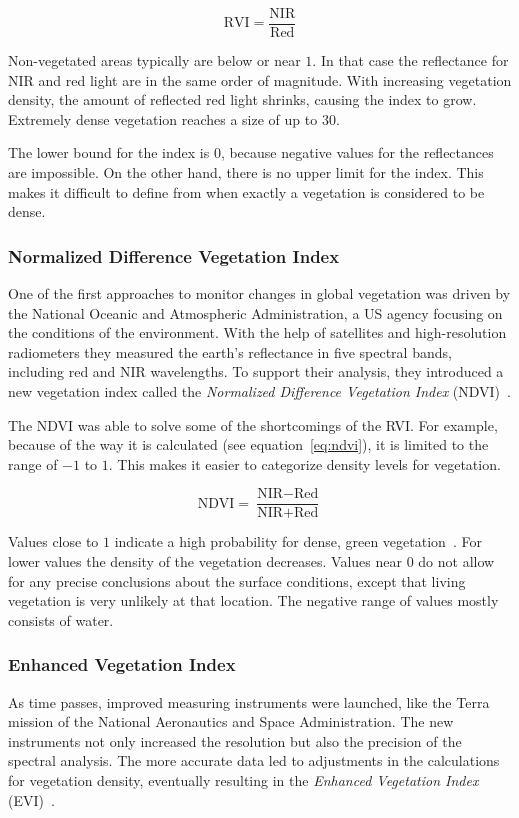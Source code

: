 \begin{equation}
    \text{RVI} = \frac{\text{NIR}}{\text{Red}}
    \label{eq:rvi}
\end{equation}

Non-vegetated areas typically are below or near $1$. In that case the reflectance for NIR and red light are in the same order of magnitude. With increasing vegetation density, the amount of reflected red light shrinks, causing the index to grow. Extremely dense vegetation reaches a size of up to $30$.

The lower bound for the index is $0$, because negative values for the reflectances are impossible. On the other hand, there is no upper limit for the index. This makes it difficult to define from when exactly a vegetation is considered to be dense.

\subsubsection{Normalized Difference Vegetation Index}
One of the first approaches to monitor changes in global vegetation was driven by the National Oceanic and Atmospheric Administration, a US agency focusing on the conditions of the environment. With the help of satellites and high-resolution radiometers they measured the earth's reflectance in five spectral bands, including red and NIR wavelengths. To support their analysis, they introduced a new vegetation index called the \emph{Normalized Difference Vegetation Index} (NDVI)~\cite{measuring_vegetation00}.

The NDVI was able to solve some of the shortcomings of the RVI. For example, because of the way it is calculated (see equation~\ref{eq:ndvi}), it is limited to the range of $-1$ to $1$. This makes it easier to categorize density levels for vegetation.

\begin{equation}
    \text{NDVI} = \frac{\text{NIR}-\text{Red}}{\text{NIR}+\text{Red}}
    \label{eq:ndvi}
\end{equation}

Values close to $1$ indicate a high probability for dense, green vegetation~\cite{gisg_ndvi20}. For lower values the density of the vegetation decreases. Values near $0$ do not allow for any precise conclusions about the surface conditions, except that living vegetation is very unlikely at that location. The negative range of values mostly consists of water.

\subsubsection{Enhanced Vegetation Index}
As time passes, improved measuring instruments were launched, like the Terra mission of the National Aeronautics and Space Administration. The new instruments not only increased the resolution but also the precision of the spectral analysis. The more accurate data led to adjustments in the calculations for vegetation density, eventually resulting in the \emph{Enhanced Vegetation Index} (EVI)~\cite{modis2002}.
\clearpage

